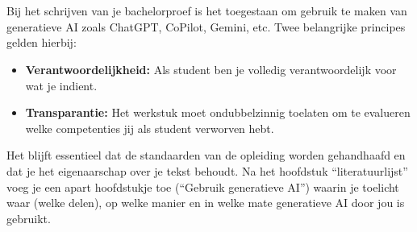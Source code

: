 


\chapter*{}%
\label{ch:genAI}

Bij het schrijven van je bachelorproef is het toegestaan om gebruik te maken van generatieve AI zoals ChatGPT, CoPilot, Gemini, etc. Twee belangrijke principes gelden hierbij:
\begin{itemize}[]
    \item \textbf{Verantwoordelijkheid:} Als student ben je volledig verantwoordelijk voor wat je indient.
    \item \textbf{Transparantie:} Het werkstuk moet ondubbelzinnig toelaten om te evalueren welke competenties jij als student verworven hebt.
\end{itemize}
Het blijft essentieel dat de standaarden van de opleiding worden gehandhaafd en dat je het eigenaarschap over je tekst behoudt.
Na het hoofdstuk “literatuurlijst” voeg je een apart hoofdstukje toe (“Gebruik generatieve AI”) waarin je toelicht waar (welke delen), op welke manier en in welke mate generatieve AI door jou is gebruikt.